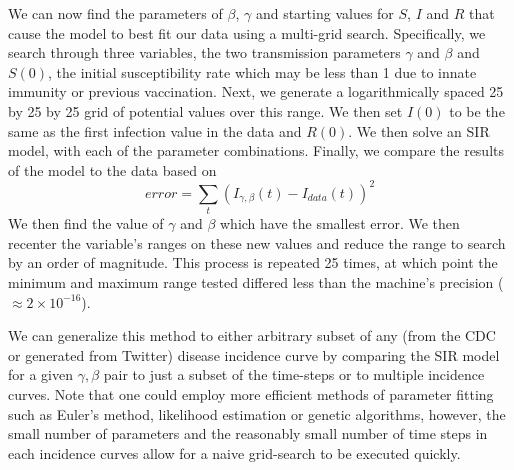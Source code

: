 We can now find the parameters of \(\beta\), \(\gamma\) and starting values for \(S\), \(I\) and \(R\) that cause the model to best fit our data using a multi-grid search. Specifically, we search through three variables, the two transmission parameters \(\gamma\) and \(\beta\) and \(S(0)\), the initial susceptibility rate which may be less than 1 due to innate immunity or previous vaccination. 
Next, we generate a logarithmically spaced 25 by 25 by 25 grid of potential values over this range. We then set \(I(0)\) to be the same as the first infection value in the data and \(R(0)\). We then solve an SIR model, with each of the parameter combinations. Finally, we compare the results of the model to the data based on 
\begin{equation}
error = \sum_t (I_{\gamma,\beta}(t) - I_{data}(t))^2
\end{equation}
 We then find the value of \(\gamma\) and \(\beta\) which have the smallest error. We then recenter the variable's ranges on these new values and reduce the range to search by an order of magnitude. This process is repeated 25 times, at which point the minimum and maximum range tested differed less than the machine's precision (\(\approx 2\times 10^{-16}\)).


We can generalize this method to either arbitrary subset of any (from the CDC or generated from Twitter) disease incidence curve by comparing the SIR model for a given \(\gamma,\beta\) pair to just a subset of the time-steps or to multiple incidence curves. Note that one could employ more efficient methods of parameter fitting such as Euler's method,\cite{diekmann2012mathematical} likelihood estimation\cite{yang2015inference} or genetic algorithms,\cite{banzhaf1998genetic} however, the small number of parameters and the reasonably small number of time steps in each incidence curves allow for a naive grid-search to be executed quickly.


